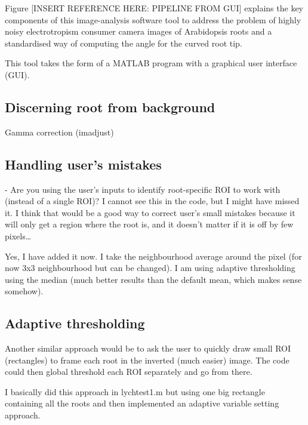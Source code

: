 Figure [INSERT REFERENCE HERE: PIPELINE FROM GUI] explains the key components of this image-analysis software tool to address the problem of highly noisy electrotropism consumer camera images of Arabidopsis roots and a standardised way of computing the angle for the curved root tip. 

This tool takes the form of a MATLAB program with a graphical user interface (GUI).

\subsection{Discerning root from background}

Gamma correction (imadjust)

\subsection{Handling user's mistakes}

- Are you using the user’s inputs to identify root-specific ROI to work with (instead of a single ROI)? I cannot see this in the code, but I might have missed it. I think that would be a good way to correct user’s small mistakes because it will only get a region where the root is, and it doesn’t matter if it is off by few pixels…

Yes, I have added it now. I take the neighbourhood average around the pixel (for now 3x3 neighbourhood but can be changed).
I am using adaptive thresholding using the median (much better results than the default mean, which makes sense somehow).

\subsection{Adaptive thresholding}

 Another similar approach would be to ask the user to quickly draw small ROI (rectangles) to frame each root in the inverted (much easier) image. The code could then global threshold each ROI separately and go from there.
 
 I basically did this approach in lychtest1.m but using one big rectangle containing all the roots and then implemented an adaptive variable setting approach.
 
